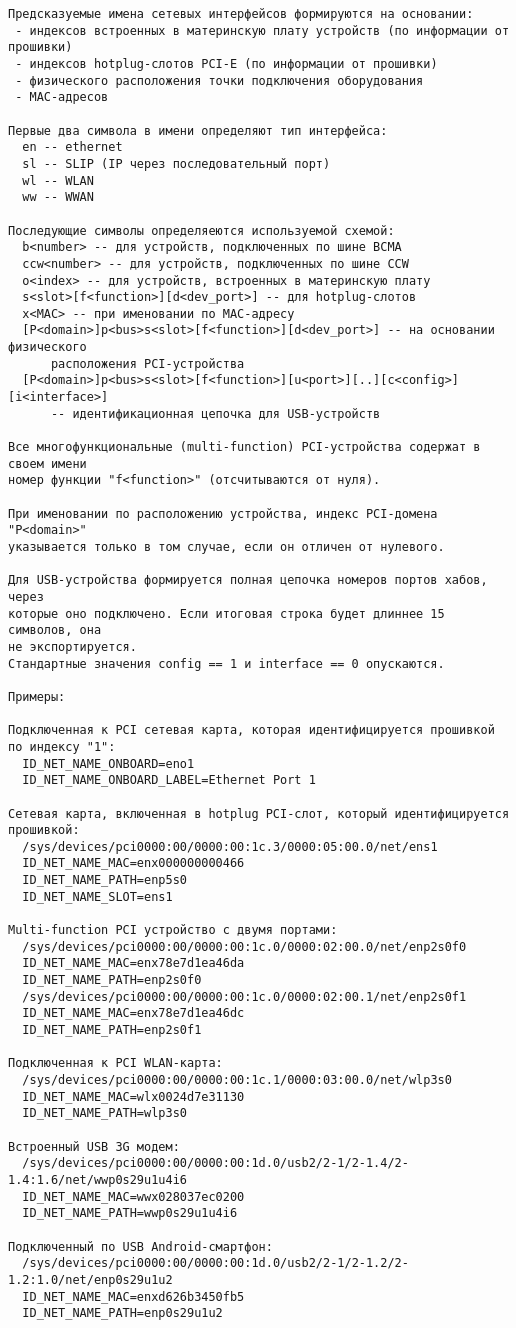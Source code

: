 \documentclass[10pt,oneside,a4paper]{article}
\begin{document}
\begin{Verbatim}
Предсказуемые имена сетевых интерфейсов формируются на основании:
 - индексов встроенных в материнскую плату устройств (по информации от прошивки)
 - индексов hotplug-слотов PCI-E (по информации от прошивки)
 - физического расположения точки подключения оборудования
 - MAC-адресов

Первые два символа в имени определяют тип интерфейса:
  en -- ethernet
  sl -- SLIP (IP через последовательный порт)
  wl -- WLAN
  ww -- WWAN

Последующие символы определяеются используемой схемой:
  b<number> -- для устройств, подключенных по шине BCMA
  ccw<number> -- для устройств, подключенных по шине CCW
  o<index> -- для устройств, встроенных в материнскую плату
  s<slot>[f<function>][d<dev_port>] -- для hotplug-слотов
  x<MAC> -- при именовании по MAC-адресу
  [P<domain>]p<bus>s<slot>[f<function>][d<dev_port>] -- на основании физического
      расположения PCI-устройства
  [P<domain>]p<bus>s<slot>[f<function>][u<port>][..][c<config>][i<interface>]
      -- идентификационная цепочка для USB-устройств

Все многофункциональные (multi-function) PCI-устройства содержат в своем имени
номер функции "f<function>" (отсчитываются от нуля).

При именовании по расположению устройства, индекс PCI-домена "P<domain>"
указывается только в том случае, если он отличен от нулевого.

Для USB-устройства формируется полная цепочка номеров портов хабов, через
которые оно подключено. Если итоговая строка будет длиннее 15 символов, она
не экспортируется.
Стандартные значения config == 1 и interface == 0 опускаются.

Примеры:

Подключенная к PCI сетевая карта, которая идентифицируется прошивкой
по индексу "1":
  ID_NET_NAME_ONBOARD=eno1
  ID_NET_NAME_ONBOARD_LABEL=Ethernet Port 1

Сетевая карта, включенная в hotplug PCI-слот, который идентифицируется
прошивкой:
  /sys/devices/pci0000:00/0000:00:1c.3/0000:05:00.0/net/ens1
  ID_NET_NAME_MAC=enx000000000466
  ID_NET_NAME_PATH=enp5s0
  ID_NET_NAME_SLOT=ens1

Multi-function PCI устройство с двумя портами:
  /sys/devices/pci0000:00/0000:00:1c.0/0000:02:00.0/net/enp2s0f0
  ID_NET_NAME_MAC=enx78e7d1ea46da
  ID_NET_NAME_PATH=enp2s0f0
  /sys/devices/pci0000:00/0000:00:1c.0/0000:02:00.1/net/enp2s0f1
  ID_NET_NAME_MAC=enx78e7d1ea46dc
  ID_NET_NAME_PATH=enp2s0f1

Подключенная к PCI WLAN-карта:
  /sys/devices/pci0000:00/0000:00:1c.1/0000:03:00.0/net/wlp3s0
  ID_NET_NAME_MAC=wlx0024d7e31130
  ID_NET_NAME_PATH=wlp3s0

Встроенный USB 3G модем:
  /sys/devices/pci0000:00/0000:00:1d.0/usb2/2-1/2-1.4/2-1.4:1.6/net/wwp0s29u1u4i6
  ID_NET_NAME_MAC=wwx028037ec0200
  ID_NET_NAME_PATH=wwp0s29u1u4i6

Подключенный по USB Android-смартфон:
  /sys/devices/pci0000:00/0000:00:1d.0/usb2/2-1/2-1.2/2-1.2:1.0/net/enp0s29u1u2
  ID_NET_NAME_MAC=enxd626b3450fb5
  ID_NET_NAME_PATH=enp0s29u1u2
\end{Verbatim}
\end{document}
